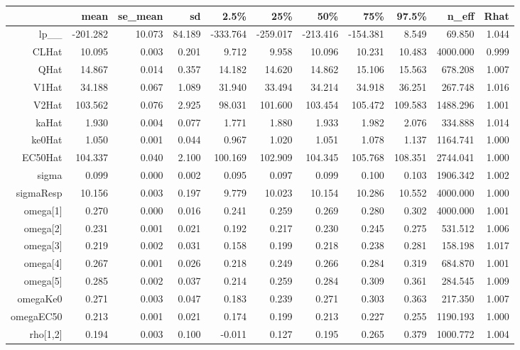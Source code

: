 \documentclass[10pt, reqno, oneside]{amsbook}
\numberwithin{equation}{chapter}
\numberwithin{figure}{chapter}
\numberwithin{table}{chapter}
\theoremstyle{remark}
\begin{document}
\begin{table}[htbp]
\centering
\footnotesize
\begin{tabular}{r r r r r r r r r r r}
 & mean & se\_mean & sd & 2.5\% & 25\% & 50\% & 75\% & 97.5\% & n\_eff & Rhat\\
\hline
lp\_\_ & -201.282 & 10.073 & 84.189 & -333.764 & -259.017 & -213.416 & -154.381 & 8.549 & 69.850 & 1.044\\
CLHat & 10.095 & 0.003 & 0.201 & 9.712 & 9.958 & 10.096 & 10.231 & 10.483 & 4000.000 & 0.999\\
QHat & 14.867 & 0.014 & 0.357 & 14.182 & 14.620 & 14.862 & 15.106 & 15.563 & 678.208 & 1.007\\
V1Hat & 34.188 & 0.067 & 1.089 & 31.940 & 33.494 & 34.214 & 34.918 & 36.251 & 267.748 & 1.016\\
V2Hat & 103.562 & 0.076 & 2.925 & 98.031 & 101.600 & 103.454 & 105.472 & 109.583 & 1488.296 & 1.001\\
kaHat & 1.930 & 0.004 & 0.077 & 1.771 & 1.880 & 1.933 & 1.982 & 2.076 & 334.888 & 1.014\\
ke0Hat & 1.050 & 0.001 & 0.044 & 0.967 & 1.020 & 1.051 & 1.078 & 1.137 & 1164.741 & 1.000\\
EC50Hat & 104.337 & 0.040 & 2.100 & 100.169 & 102.909 & 104.345 & 105.768 & 108.351 & 2744.041 & 1.000\\
sigma & 0.099 & 0.000 & 0.002 & 0.095 & 0.097 & 0.099 & 0.100 & 0.103 & 1906.342 & 1.002\\
sigmaResp & 10.156 & 0.003 & 0.197 & 9.779 & 10.023 & 10.154 & 10.286 & 10.552 & 4000.000 & 1.000\\
omega[1] & 0.270 & 0.000 & 0.016 & 0.241 & 0.259 & 0.269 & 0.280 & 0.302 & 4000.000 & 1.001\\
omega[2] & 0.231 & 0.001 & 0.021 & 0.192 & 0.217 & 0.230 & 0.245 & 0.275 & 531.512 & 1.006\\
omega[3] & 0.219 & 0.002 & 0.031 & 0.158 & 0.199 & 0.218 & 0.238 & 0.281 & 158.198 & 1.017\\
omega[4] & 0.267 & 0.001 & 0.026 & 0.218 & 0.249 & 0.266 & 0.284 & 0.319 & 684.870 & 1.001\\
omega[5] & 0.285 & 0.002 & 0.037 & 0.214 & 0.259 & 0.284 & 0.309 & 0.361 & 284.545 & 1.009\\
omegaKe0 & 0.271 & 0.003 & 0.047 & 0.183 & 0.239 & 0.271 & 0.303 & 0.363 & 217.350 & 1.007\\
omegaEC50 & 0.213 & 0.001 & 0.021 & 0.174 & 0.199 & 0.213 & 0.227 & 0.255 & 1190.193 & 1.000\\
rho[1,2] & 0.194 & 0.003 & 0.100 & -0.011 & 0.127 & 0.195 & 0.265 & 0.379 & 1000.772 & 1.004\\

\end{tabular}
\end{table}
\end{document}
